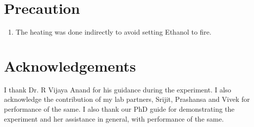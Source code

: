 \section{Precaution}
	\begin{enumerate}
		\item The heating was done indirectly to avoid setting Ethanol to fire.
	\end{enumerate}

	
\section{Acknowledgements}
I thank Dr. R Vijaya Anand for his guidance during the experiment. I also acknowledge the contribution of my lab partners, Srijit, Prashansa and Vivek for performance of the same. I also thank our PhD guide for demonstrating the experiment and her assistance in general, with performance of the same.


